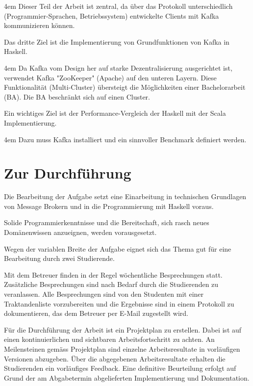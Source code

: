 \par
\begingroup
\leftskip4em
\rightskip\leftskip
Dieser Teil der Arbeit ist zentral, da über das Protokoll unterschiedlich
(Programmier-Sprachen, Betriebssystem) entwickelte Clients mit Kafka
kommunizieren können.
\par
\endgroup

Das dritte Ziel ist die Implementierung von Grundfunktionen von Kafka in
Haskell.

\par
\begingroup
\leftskip4em
\rightskip\leftskip
Da Kafka vom Design her auf starke Dezentralisierung ausgerichtet ist, verwendet
Kafka "ZooKeeper" (Apache) auf den unteren Layern. Diese Funktionalität
(Multi-Cluster) übersteigt die Möglichkeiten einer Bachelorarbeit (BA). Die BA
beschränkt sich auf einen Cluster.
\par
\endgroup

Ein wichtiges Ziel ist der Performance-Vergleich der Haskell mit der Scala
Implementierung.

\par
\begingroup
\leftskip4em
\rightskip\leftskip
Dazu muss Kafka installiert und ein sinnvoller Benchmark definiert werden.
\par
\endgroup

\section*{Zur Durchführung}
Die Bearbeitung der Aufgabe setzt eine Einarbeitung in technischen Grundlagen
von Message Brokern und in die Programmierung mit Haskell  voraus.

Solide Programmierkenntnisse und die Bereitschaft, sich rasch neues
Domänenwissen anzueignen, werden vorausgesetzt. 

Wegen der variablen Breite der Aufgabe eignet sich das Thema gut für eine
Bearbeitung durch zwei Studierende. 

Mit dem Betreuer finden in der Regel wöchentliche Besprechungen statt.
Zusätzliche Besprechungen sind nach Bedarf durch die Studierenden zu
veranlassen. Alle Besprechungen sind von den Studenten mit einer Traktandenliste
vorzubereiten und die Ergebnisse sind in einem Protokoll zu dokumentieren, das
dem Betreuer per E-Mail zugestellt wird.

Für die Durchführung der Arbeit ist ein Projektplan zu erstellen. Dabei ist auf
einen kontinuierlichen und sichtbaren Arbeitsfortschritt zu achten. An
Meilensteinen gemäss Projektplan sind einzelne Arbeitsresultate in vorläufigen
Versionen abzugeben. Über die abgegebenen Arbeitsresultate erhalten die
Studierenden ein vorläufiges Feedback. Eine definitive Beurteilung erfolgt auf
Grund der am Abgabetermin abgelieferten Implementierung und Dokumentation. 

